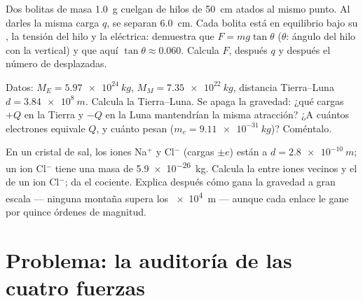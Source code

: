 \begin{exercise}[$\star\star\star$]\label{exo:g11:fundamental-interactions:13}
Dos bolitas de masa \qty{1.0}{g} cuelgan de hilos de \qty{50}{cm}
atados al mismo punto. Al darles la misma carga $q$, se separan
\qty{6.0}{cm}. Cada bolita está en equilibrio bajo su , la tensión
del hilo y la  eléctrica: demuestra que $F = mg\tan\theta$
($\theta$: ángulo del hilo con la vertical) y que aquí
$\tan\theta \approx 0.060$. Calcula $F$, después $q$ y después el número
de  desplazadas.
\end{exercise}

\begin{exercise}[$\star\star\star$]\label{exo:g11:fundamental-interactions:14}
Datos: $M_E = \qty{5.97e24}{kg}$, $M_M = \qty{7.35e22}{kg}$, distancia
Tierra--Luna $d = \qty{3.84e8}{m}$. Calcula la 
Tierra--Luna. Se apaga la gravedad: ¿qué cargas $+Q$ en la Tierra y $-Q$
en la Luna mantendrían la misma atracción? ¿A cuántos electrones
equivale $Q$, y cuánto pesan ($m_e = \qty{9.11e-31}{kg}$)? Coméntalo.
\end{exercise}

\begin{exercise}[$\star\star\star$]\label{exo:g11:fundamental-interactions:15}
En un cristal de sal, los iones Na$^{+}$ y Cl$^{-}$ (cargas $\pm e$)
están a $d = \qty{2.8e-10}{m}$; un ion Cl$^{-}$ tiene una masa de
\qty{5.9e-26}{kg}. Calcula la  entre iones vecinos y el  de un
ion Cl$^{-}$; da el cociente. Explica después cómo gana la gravedad a
gran escala --- ninguna montaña supera los \qty{e4}{m} --- aunque cada
enlace le gane por quince órdenes de magnitud.
\end{exercise}

\section{Problema: la auditoría de las cuatro fuerzas}

